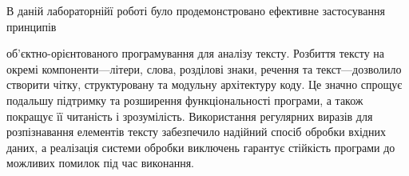 \documentclass[12pt,a4paper]{article}
\begin{document}
    \vspace{1em}

    В даній лабораторнійї роботі було продемонстровано ефективне застосування принципів

    \setlength{\parindent}{0pt}
    
    об'єктно-орієнтованого програмування для аналізу тексту. Розбиття тексту на окремі компоненти—літери, слова, розділові знаки, речення та текст—дозволило створити чітку, структуровану та модульну архітектуру коду. Це значно спрощує подальшу підтримку та розширення функціональності програми, а також покращує її читаність і зрозумілість.
    Використання регулярних виразів для розпізнавання елементів тексту забезпечило надійний спосіб обробки вхідних даних, а реалізація системи обробки виключень гарантує стійкість програми до можливих помилок під час виконання.
\end{document}
